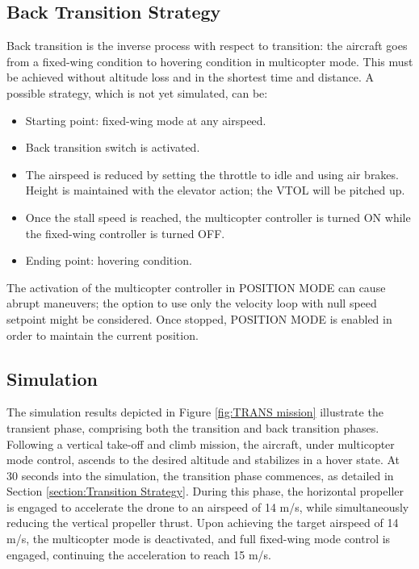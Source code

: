 \subsection{Back Transition Strategy}
\label{section:Back Transition Strategy}
Back transition is the inverse process with respect to transition: the aircraft goes from a fixed-wing condition to hovering condition in multicopter mode. This must be achieved without altitude loss and in the shortest time and distance. A possible strategy, which is not yet simulated, can be:
\begin{itemize}
    \item Starting point: fixed-wing mode at any airspeed.
    \item Back transition switch is activated.
    \item The airspeed is reduced by setting the throttle to idle and using air brakes. Height is maintained with the elevator action; the VTOL will be pitched up.
    \item Once the stall speed is reached, the multicopter controller is turned ON while the fixed-wing controller is turned OFF.
    \item Ending point: hovering condition.
\end{itemize}

The activation of the multicopter controller in POSITION MODE can cause abrupt maneuvers; the option to use only the velocity loop with null speed setpoint might be considered. Once stopped, POSITION MODE is enabled in order to maintain the current position.

\subsection{Simulation}
The simulation results depicted in Figure \ref{fig:TRANS mission} illustrate the transient phase, comprising both the transition and back transition phases. Following a vertical take-off and climb mission, the aircraft, under multicopter mode control, ascends to the desired altitude and stabilizes in a hover state. At 30 seconds into the simulation, the transition phase commences, as detailed in Section \ref{section:Transition Strategy}. During this phase, the horizontal propeller is engaged to accelerate the drone to an airspeed of 14 m/s, while simultaneously reducing the vertical propeller thrust. Upon achieving the target airspeed of 14 m/s, the multicopter mode is deactivated, and full fixed-wing mode control is engaged, continuing the acceleration to reach 15 m/s.

